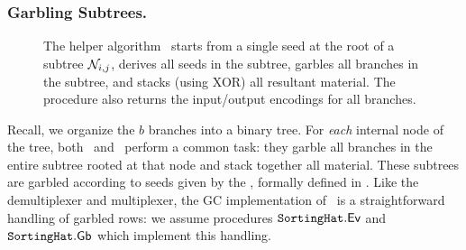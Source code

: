 \subsubsection{Garbling Subtrees.}
\begin{figure}[t!]\centering{}
  \caption{%
    The helper algorithm \gbtree\ starts from a single seed
    at the root of a subtree $\mathtt{\cal N}_{i,j}$, derives all seeds in the
    subtree, garbles all branches in the subtree, and stacks (using
    XOR) all resultant material. The procedure also returns the
    input/output encodings for all branches.
  }\label{fig:gbtree}
\end{figure}

Recall, we organize the $b$ branches into a binary tree.
For \emph{each} internal node of the tree, both \evcond\ and \gbcond\
perform a common task: they garble all branches in the entire subtree
rooted at that node and stack together all material.
%
These subtrees are garbled according to seeds given by the
\gadget, formally defined in . Like the
demultiplexer and multiplexer, the GC implementation of \gadget\ is
a straightforward handling of garbled rows: we assume procedures
$\mathtt{SortingHat}.\textsf{Ev}$ and $\mathtt{SortingHat}.\textsf{Gb}$ which implement this handling.
%

